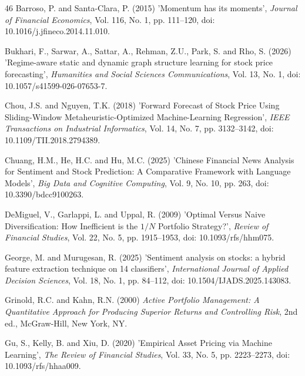 \documentclass{singlecol-new}
\theoremstyle{TH}{
\newtheorem{lemma}{Lemma}
\newtheorem{theorem}[lemma]{Theorem}
\newtheorem{corrolary}[lemma]{Corrolary}
\newtheorem{conjecture}[lemma]{Conjecture}
\newtheorem{proposition}[lemma]{Proposition}
\newtheorem{claim}[lemma]{Claim}
\newtheorem{stheorem}[lemma]{Wrong Theorem}
\newtheorem{algorithm}{Algorithm}
}
\theoremstyle{THrm}{
\newtheorem{definition}{Definition}[section]
\newtheorem{question}{Question}[section]
\newtheorem{remark}{Remark}
\newtheorem{scheme}{Scheme}
}
\theoremstyle{THhit}{
\newtheorem{case}{Case}[section]
}
\begin{document}
\begin{thebibliography}{46}
Barroso, P. and Santa-Clara, P. (2015) 'Momentum has its moments', {\it Journal of Financial Economics}, Vol. 116, No. 1, pp. 111--120, doi: 10.1016/j.jfineco.2014.11.010.

Bukhari, F., Sarwar, A., Sattar, A., Rehman, Z.U., Park, S. and Rho, S. (2026) 'Regime-aware static and dynamic graph structure learning for stock price forecasting', {\it Humanities and Social Sciences Communications}, Vol. 13, No. 1, doi: 10.1057/s41599-026-07653-7.

Chou, J.S. and Nguyen, T.K. (2018) 'Forward Forecast of Stock Price Using Sliding-Window Metaheuristic-Optimized Machine-Learning Regression', {\it IEEE Transactions on Industrial Informatics}, Vol. 14, No. 7, pp. 3132--3142, doi: 10.1109/TII.2018.2794389.

Chuang, H.M., He, H.C. and Hu, M.C. (2025) 'Chinese Financial News Analysis for Sentiment and Stock Prediction: A Comparative Framework with Language Models', {\it Big Data and Cognitive Computing}, Vol. 9, No. 10, pp. 263, doi: 10.3390/bdcc9100263.

DeMiguel, V., Garlappi, L. and Uppal, R. (2009) 'Optimal Versus Naive Diversification: How Inefficient is the $1/N$ Portfolio Strategy?', {\it Review of Financial Studies}, Vol. 22, No. 5, pp. 1915--1953, doi: 10.1093/rfs/hhm075.

George, M. and Murugesan, R. (2025) 'Sentiment analysis on stocks: a hybrid feature extraction technique on 14 classifiers', {\it International Journal of Applied Decision Sciences}, Vol. 18, No. 1, pp. 84--112, doi: 10.1504/IJADS.2025.143083.

Grinold, R.C. and Kahn, R.N. (2000) {\it Active Portfolio Management: A Quantitative Approach for Producing Superior Returns and Controlling Risk}, 2nd ed., McGraw-Hill, New York, NY.

Gu, S., Kelly, B. and Xiu, D. (2020) 'Empirical Asset Pricing via Machine Learning', {\it The Review of Financial Studies}, Vol. 33, No. 5, pp. 2223--2273, doi: 10.1093/rfs/hhaa009.


\end{thebibliography}
\end{document}
